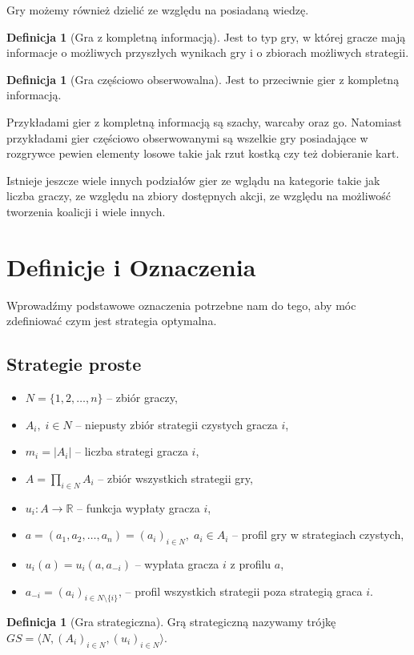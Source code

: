 \documentclass[inzynierska]{pwr_wmat_praca_dyplomowa}
\theoremstyle{plain}
\numberwithin{theorem}{chapter}
\theoremstyle{definition}
\numberwithin{theorem}{chapter}
\newtheorem{definition}[theorem]{Definicja}
\begin{document}
Gry możemy również dzielić ze względu na posiadaną wiedzę.
\begin{definition}[Gra z kompletną informacją]
	Jest to typ gry, w której gracze mają informacje o możliwych
	przyszłych wynikach gry i o zbiorach możliwych strategii.
\end{definition}
\begin{definition}[Gra częściowo obserwowalna]
	Jest to przeciwnie gier z kompletną informacją.
\end{definition}
Przykładami gier z kompletną informacją są szachy, warcaby oraz go.
Natomiast przykładami gier częściowo obserwowanymi są wszelkie gry posiadające w rozgrywce pewien elementy losowe takie jak rzut kostką czy też dobieranie kart. 

Istnieje jeszcze wiele innych podziałów gier ze wglądu na kategorie takie jak liczba graczy, ze względu na zbiory dostępnych akcji, ze względu na możliwość tworzenia koalicji i wiele innych.

\section{Definicje i Oznaczenia}
Wprowadźmy podstawowe oznaczenia potrzebne nam do tego, aby móc zdefiniować czym jest strategia optymalna.
\subsection{Strategie proste}
\begin{itemize}
	\item $ N = \{1,2,\dots, n\} $ -- zbiór graczy,
	\item $A_i,\; i \in N $ -- niepusty zbiór strategii  czystych gracza $i$,
	\item $m_i = |A_i|$ -- liczba strategi gracza $i$,
	\item $A = \displaystyle\prod_{i \in N} A_i$ -- zbiór wszystkich strategii gry, 
	\item $u_i : A \rightarrow \mathbb{R} $ -- funkcja wypłaty gracza $i$,
	\item $a=(a_1,a_2,\dots,a_n)=(a_i)_{i \in N},\; a_i \in A_i$ -- profil gry w strategiach czystych,
	\item $u_i(a) = u_i(a,a_{-i})$ -- wypłata gracza $i$ z profilu $a$,
	\item $a_{-i} = (a_i)_{i\in N \setminus \{i\}}$, -- profil wszystkich strategii poza strategią graca $i$.
\end{itemize}
	\begin{definition}[Gra strategiczna]
		Grą strategiczną nazywamy trójkę $GS = \langle N, (A_i)_{i \in N},(u_i)_{i \in N} \rangle $.
	\end{definition}
	
\end{document}
